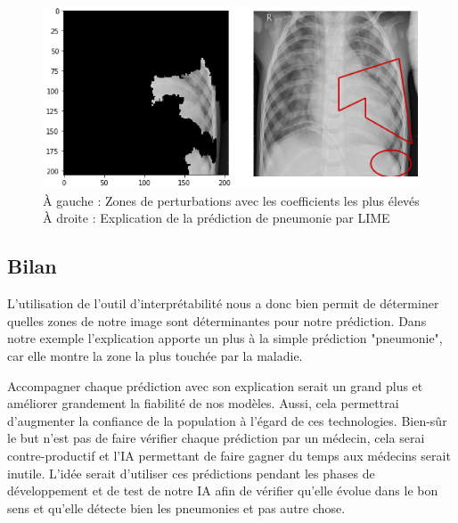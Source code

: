 \begin{figure}[h]
    \includegraphics[scale=0.58]{src_img/limeFinalExplainMerge.png}
    \caption{À gauche : Zones de perturbations avec les coefficients les plus élevés
    À droite : Explication de la prédiction de pneumonie par LIME}
    \label{limeFinalExplain}
\end{figure}
\subsection{Bilan}
L'utilisation de l'outil d'interprétabilité nous a donc bien permit de déterminer quelles zones de notre image sont déterminantes pour notre prédiction. Dans notre exemple l'explication apporte un plus à la simple prédiction "pneumonie", car elle montre la zone la plus touchée par la maladie.\par
Accompagner chaque prédiction avec son explication serait un grand plus et améliorer grandement la fiabilité de nos modèles. Aussi, cela permettrai d'augmenter la confiance de la population à l'égard de ces technologies. Bien-sûr le but n'est pas de faire vérifier chaque prédiction par un médecin, cela serai contre-productif et l'IA permettant de faire gagner du temps aux médecins serait inutile. L'idée serait d'utiliser ces prédictions pendant les phases de développement et de test de notre IA afin de vérifier qu'elle évolue dans le bon sens et qu'elle détecte bien les pneumonies et pas autre chose.